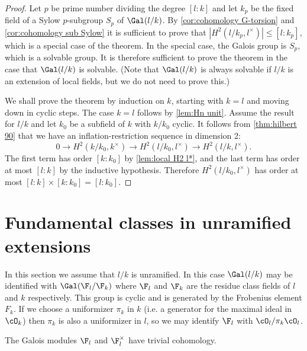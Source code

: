 \begin{proof}
	Let $p$ be prime number dividing the degree $[l:k]$ and let $k_p$ be the fixed field
	of a Sylow $p$-subgroup $S_p$ of $\Gal(l/k)$.
	By \ref{cor:cohomology G-torsion} and \ref{cor:cohomology sub Sylow}
	it is sufficient to prove that $|H^2(l/k_p,l^\times)| \le [l:k_p]$,
	which is a special case of the theorem.
	In the special case, the Galois group is $S_p$, which is a solvable group.
	It is therefore sufficient to prove the theorem in the case that $\Gal(l/k)$ is solvable.
	(Note that $\Gal(l/k)$ is always solvable if $l/k$ is an extension of local fields,
	but we do not need to prove this.)

	We shall prove the theorem by induction on $k$, starting with $k=l$ and moving down in
	cyclic steps.
	The case $k=l$ follows by \ref{lem:Hn unit}.
	Assume the result for $l/k$ and let $k_0$ be a subfield of $k$ with $k/k_0$ cyclic.
	It follows from \ref{thm:hilbert 90} that
	we have an inflation-restriction sequence in dimension 2:
	\[
		0 \to H^2(k/k_0, k^\times) \to H^2( l/k_0, l^\times) \to H^2(l/k, l^\times).
	\]
	The first term has order $[k : k_0]$ by \ref{lem:local H2 l*}, and the last term has
	order at most $[l:k]$ by the inductive hypothesis.
	Therefore $H^2( l/k_0, l^\times)$ has order at most $[l:k] \times [k : k_0] = [l: k_0]$.
\end{proof}

\section{Fundamental classes in unramified extensions}

In this section we assume that $l/k$ is unramified.
In this case $\Gal(l/k)$ may be identified with $\Gal(\F_l / \F_k)$ where
$\F_l$ and $\F_k$ are the residue class fields of $l$ and $k$ respectively.
This group is cyclic and is generated by the Frobenius element $F_k$.
If we choose a uniformizer $\pi_k$ in $k$ (i.e. a generator for the maximal ideal in $\cO_k$)
then $\pi_k$ is also a uniformizer in $l$, so we may identify $\F_l$ with $\cO_l / \pi_k \cO_l$.

\begin{lemma} \label{lem:finite field trivial}
	The Galois modules $\F_l$ and $\F_l^\times$ have trivial cohomology.
\end{lemma}

